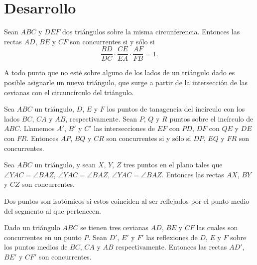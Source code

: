 \section{Desarrollo}


\begin{section-theorem.tcb}
    Sean $ABC$ y $DEF$ dos triángulos sobre la misma circunferencia.
    Entonces las rectas $AD$, $BE$ y $CF$ son concurrentes si y sólo si
    \[\frac{BD}{DC} \cdot \frac{CE}{EA} \cdot \frac{AF}{FB} = 1.\]
\end{section-theorem.tcb}

\begin{section-definition}
    A todo punto que no esté sobre alguno de los lados de un triángulo dado es posible asignarle un nuevo triángulo, que surge a partir de la intersección de las cevianas con el circuncírculo del triángulo.
\end{section-definition}

\begin{section-theorem.tcb}
    Sea $ABC$ un triángulo, $D$, $E$ y $F$ los puntos de tanagencia del incírculo con los lados $BC$, $CA$ y $AB$, respectivamente.
    Sean $P$, $Q$ y $R$ puntos sobre el incírculo de $ABC$.
    Llamemos $A'$, $B'$ y $C'$ las intersecciones de $EF$ con $PD$, $DF$ con $QE$ y $DE$ con $FR$.
    Entonces $AP$, $BQ$ y $CR$ son concurrentes si y sólo si $DP$, $EQ$ y $FR$ son concurrentes.
\end{section-theorem.tcb}

\begin{section-theorem.tcb}
    Sea $ABC$ un triángulo, y sean $X$, $Y$, $Z$ tres puntos en el plano tales que $\angle YAC = \angle BAZ$, $\angle YAC = \angle BAZ$, $\angle YAC = \angle BAZ$.
    Entonces las rectas $AX$, $BY$ y $CZ$ son concurrentes.
\end{section-theorem.tcb}

\begin{section-definition}
    Dos puntos son isotómicos si estos coinciden al ser reflejados por el punto medio del segmento al que pertenecen.
\end{section-definition}

\begin{section-definition}
    Dado un triángulo $ABC$ se tienen tres cevianas $AD$, $BE$ y $CF$ las cuales son concurrentes en un punto $P$.
    Sean $D'$, $E'$ y $F'$ las reflexiones de $D$, $E$ y $F$ sobre los puntos medios de $BC$, $CA$ y $AB$ respectivamente.
    Entonces las rectas $AD'$, $BE'$ y $CF'$ son concurrentes.
\end{section-definition}

